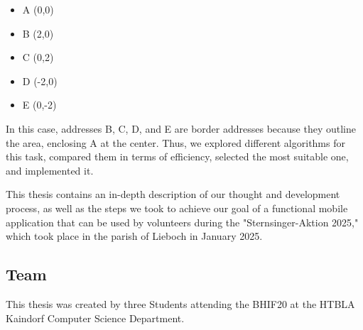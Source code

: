     \begin{itemize}
        \item A (0,0)
        \item B (2,0)
        \item C (0,2)
        \item D (-2,0)
        \item E (0,-2)
    \end{itemize}


In this case, addresses B, C, D, and E are border addresses because they outline the area, enclosing A at the center.
 Thus, we explored different algorithms for this task, compared them in terms of efficiency, selected the most suitable one, and implemented it.

\blankLine

This thesis contains an in-depth description of our thought and development process, as well as the steps we took to achieve our goal of a functional mobile application that can be used by volunteers during the "Sternsinger-Aktion 2025," which took place in the parish of Lieboch in January 2025.

\newpage

\subsection{Team}

This thesis was created by three Students attending the BHIF20 at the
HTBLA Kaindorf Computer Science Department.

\blankLine


